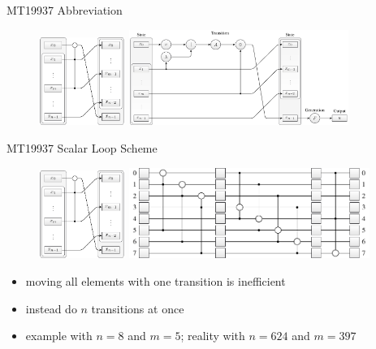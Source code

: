 \documentclass[aspectratio=169]{beamer}
\begin{document}
    \begin{frame}{MT19937 Abbreviation}
      \begin{figure}
        \includegraphics[width=0.25\textwidth]{figures/mt19937_transition_short.pdf}
        \hfill
        \includegraphics[width=0.637\textwidth]{figures/mt19937_scheme.pdf}
      \end{figure}
    \end{frame}

    \begin{frame}{MT19937 Scalar Loop Scheme}
      \begin{figure}
        \includegraphics[width=0.25\textwidth]{figures/mt19937_transition_short.pdf}
        \hfill
        \includegraphics[width=0.7\textwidth]{figures/mt19937_loop_scheme.pdf}
      \end{figure}
      \begin{itemize}
        \pause
        \item moving all elements with one transition is inefficient
        \pause
        \item instead do $n$ transitions at once
        \pause
        \item example with $n=8$ and $m=5$; reality with $n=624$ and $m=397$
      \end{itemize}
    \end{frame}
\end{document}
